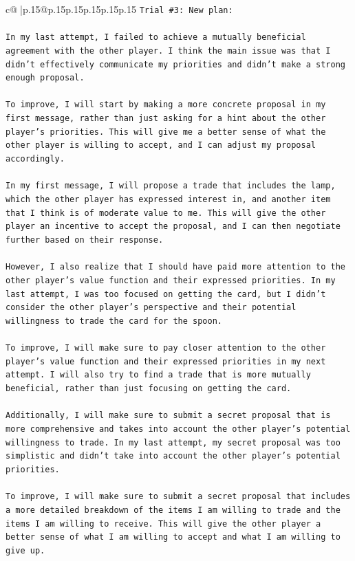 \documentclass{article}
\begin{document}
{\begin{supertabular}{c@{$\;$}|p{.15\linewidth}@{}p{.15\linewidth}p{.15\linewidth}p{.15\linewidth}p{.15\linewidth}p{.15\linewidth}}
{{{\texttt{Trial \#3: New plan: } \\
\\ 
\texttt{In my last attempt, I failed to achieve a mutually beneficial agreement with the other player. I think the main issue was that I didn't effectively communicate my priorities and didn't make a strong enough proposal. } \\
\\ 
\texttt{To improve, I will start by making a more concrete proposal in my first message, rather than just asking for a hint about the other player's priorities. This will give me a better sense of what the other player is willing to accept, and I can adjust my proposal accordingly.} \\
\\ 
\texttt{In my first message, I will propose a trade that includes the lamp, which the other player has expressed interest in, and another item that I think is of moderate value to me. This will give the other player an incentive to accept the proposal, and I can then negotiate further based on their response.} \\
\\ 
\texttt{However, I also realize that I should have paid more attention to the other player's value function and their expressed priorities. In my last attempt, I was too focused on getting the card, but I didn't consider the other player's perspective and their potential willingness to trade the card for the spoon.} \\
\\ 
\texttt{To improve, I will make sure to pay closer attention to the other player's value function and their expressed priorities in my next attempt. I will also try to find a trade that is more mutually beneficial, rather than just focusing on getting the card.} \\
\\ 
\texttt{Additionally, I will make sure to submit a secret proposal that is more comprehensive and takes into account the other player's potential willingness to trade. In my last attempt, my secret proposal was too simplistic and didn't take into account the other player's potential priorities.} \\
\\ 
\texttt{To improve, I will make sure to submit a secret proposal that includes a more detailed breakdown of the items I am willing to trade and the items I am willing to receive. This will give the other player a better sense of what I am willing to accept and what I am willing to give up.} \\
}}}
\end{supertabular}}
\end{document}
